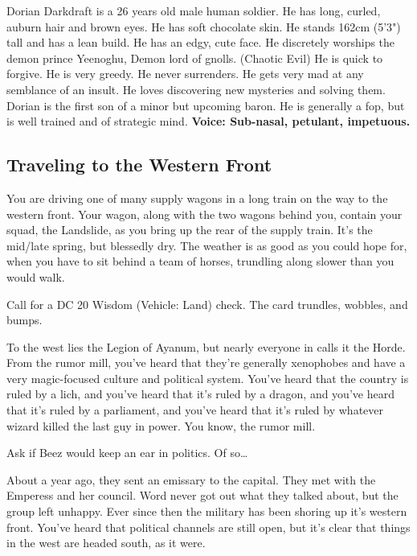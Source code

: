 Dorian Darkdraft is a 26 years old male human soldier.
He has long, curled, auburn hair and brown eyes.
He has soft chocolate skin.
He stands 162cm (5'3") tall and has a lean build.
He has an edgy, cute face.
He discretely worships the demon prince Yeenoghu, Demon lord of gnolls. (Chaotic Evil)
He is quick to forgive.
He is very greedy.
He never surrenders.
He gets very mad at any semblance of an insult.
He loves discovering new mysteries and solving them.
Dorian is the first son of a minor but upcoming baron.
He is generally a fop, but is well trained and of strategic mind.
\textbf{Voice: Sub-nasal, petulant, impetuous.}

\hrulefill
\clearpage

\begin{multicols}{2}
\subsection{Traveling to the Western Front}
  \begin{aloud}
  You are driving one of many supply wagons in a long train on the way to the western front.
  Your wagon, along with the two wagons behind you, contain your squad, the Landslide, as you
    bring up the rear of the supply train.
  It's the mid/late spring, but blessedly dry.
  The weather is as good as you could hope for, when you have to sit behind a team of horses,
    trundling along slower than you would walk.
  \end{aloud}

Call for a DC 20 Wisdom (Vehicle: Land) check.
The card trundles, wobbles, and bumps.

  \begin{aloud}
  To the west lies the Legion of Ayanum, but nearly everyone in calls it the Horde.
  From the rumor mill, you've heard that they're generally xenophobes and have a very magic-focused
    culture and political system.
  You've heard that the country is ruled by a lich, and you've heard that it's ruled by a dragon,
    and you've heard that it's ruled by a parliament, and you've heard that it's ruled by whatever
    wizard killed the last guy in power.
  You know, the rumor mill.
  \end{aloud}

Ask if Beez would keep an ear in politics.
Of so\dots

  \begin{aloud}
  About a year ago, they sent an emissary to the capital.
  They met with the Emperess and her council.
  Word never got out what they talked about, but the group left unhappy.
  Ever since then the military has been shoring up it's western front.
  You've heard that political channels are still open, but it's clear that things in the west are
    headed south, as it were.
  \end{aloud}


\end{multicols}

